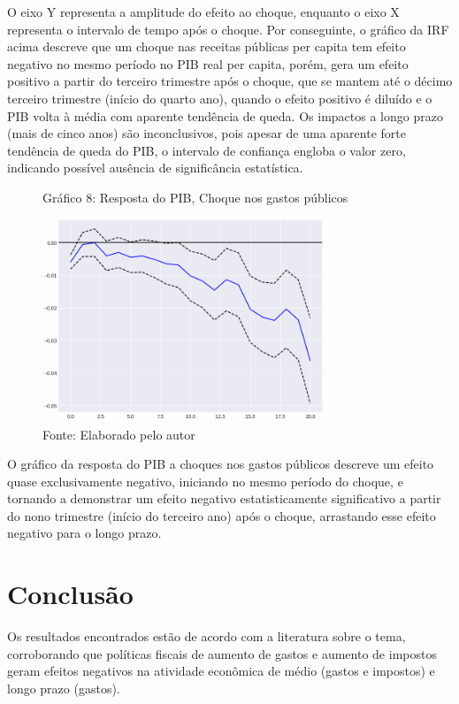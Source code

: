 \documentclass[a4paper, 12pt, openany, oneside, brazil]{abntex2}
\begin{document}
O eixo Y representa a amplitude do efeito ao choque, enquanto o eixo X representa o intervalo de tempo após o choque. Por conseguinte, o gráfico da IRF acima descreve que um choque nas receitas públicas per capita tem efeito negativo no mesmo período no PIB real per capita, porém, gera um efeito positivo a partir do terceiro trimestre após o choque, que se mantem até o décimo terceiro trimestre (início do quarto ano), quando o efeito positivo é diluído e o PIB volta à média com aparente tendência de queda. Os impactos a longo prazo (mais de cinco anos) são inconclusivos, pois apesar de uma aparente forte tendência de queda do PIB, o intervalo de confiança engloba o valor zero, indicando possível ausência de significância estatística.

\begin{figure}[h!]
	\caption*{Gráfico 8: Resposta do PIB, Choque nos gastos públicos}
	\includegraphics[width=0.75\textwidth]{resultados/irf_expenditure_gdp}
	\caption*{Fonte: Elaborado pelo autor}
\end{figure}

O gráfico da resposta do PIB a choques nos gastos públicos descreve um efeito quase exclusivamente negativo, iniciando no mesmo período do choque, e tornando a demonstrar um efeito negativo estatisticamente significativo a partir do nono trimestre (início do terceiro ano) após o choque, arrastando esse efeito negativo para o longo prazo.



\chapter{Conclusão}
Os resultados encontrados estão de acordo com a literatura sobre o tema, corroborando que políticas fiscais de aumento de gastos e aumento de impostos geram efeitos negativos na atividade econômica de médio (gastos e impostos) e longo prazo (gastos). 
\end{document}

